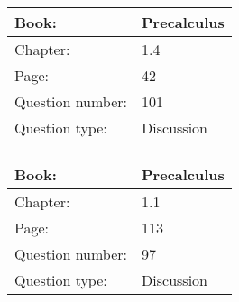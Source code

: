 \documentclass{article}
\begin{document}
            \paragraph{}
            \begin{tabularx}{1\textwidth}{
                    p{}
                    p{}
                }
                \toprule
                Book: & Precalculus
                \\
                \midrule
                Chapter: & 1.4
                \\
                \midrule
                Page: & 42
                \\
                \midrule
                Question number: & 101
                \\
                \midrule
                Question type: & Discussion
                \\
                \bottomrule
            \end{tabularx}
            
            \paragraph{}
            \begin{tabularx}{1\textwidth}{
                    p{}
                    p{}
                }
                \toprule
                Book: & Precalculus
                \\
                \midrule
                Chapter: & 1.1
                \\
                \midrule
                Page: & 113
                \\
                \midrule
                Question number: & 97
                \\
                \midrule
                Question type: & Discussion
                \\
                \bottomrule
            \end{tabularx}
            
        
\end{document}
